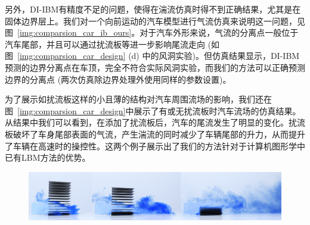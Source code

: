 另外，DI-IBM有精度不足的问题，使得在湍流仿真时得不到正确结果，尤其是在固体边界层上。我们对一个向前运动的汽车模型进行气流仿真来说明这一问题，见图~\ref{img:comparsion_car_ib_ours}。对于汽车外形来说，气流的分离点一般位于汽车尾部，并且可以通过扰流板等进一步影响尾流走向 (如图~\ref{img:comparsion_car_design} (d) 中的风洞实验)。但仿真结果显示，DI-IBM预测的边界分离点在车顶，完全不符合实际风洞实验，而我们的方法可以正确预测边界的分离点 (两次仿真除边界处理外使用同样的参数设置)。

为了展示如扰流板这样的小且薄的结构对汽车周围流场的影响，我们还在图~\ref{img:comparsion_car_design}中展示了有或无扰流板时汽车流场的仿真结果。从结果中我们可以看到，在添加了扰流板后，汽车的尾流发生了明显的变化。扰流板破坏了车身尾部表面的气流，产生湍流的同时减少了车辆尾部的升力，从而提升了车辆在高速时的操控性。这两个例子展示出了我们的方法针对于计算机图形学中已有LBM方法的优势。
\begin{figure}[htb]
  \centering
    \includegraphics[width=0.99\columnwidth]{figures/result_thin_shell_sub_grid.png}
  \label{img:result-thin-shell-sub-grid}
\end{figure}

